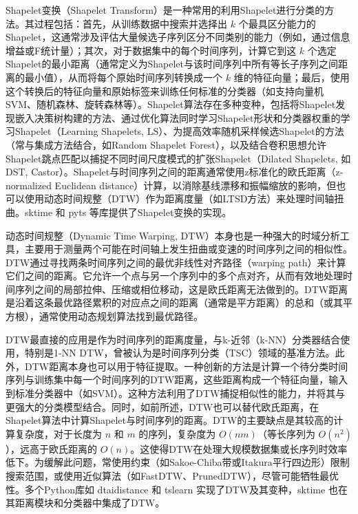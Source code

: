             Shapelet变换（Shapelet Transform）是一种常用的利用Shapelet进行分类的方法。其过程包括：首先，从训练数据中搜索并选择出 $k$ 个最具区分能力的Shapelet，这通常涉及评估大量候选子序列区分不同类别的能力（例如，通过信息增益或F统计量）；其次，对于数据集中的每个时间序列，计算它到这 $k$ 个选定Shapelet的最小距离（通常定义为Shapelet与该时间序列中所有等长子序列之间距离的最小值），从而将每个原始时间序列转换成一个 $k$ 维的特征向量；最后，使用这个转换后的特征向量和原始标签来训练任何标准的分类器（如支持向量机SVM、随机森林、旋转森林等）。Shapelet算法存在多种变种，包括将Shapelet发现嵌入决策树构建的方法、通过优化算法同时学习Shapelet形状和分类器权重的学习Shapelet（Learning Shapelets, LS）、为提高效率随机采样候选Shapelet的方法（常与集成方法结合，如Random Shapelet Forest），以及结合卷积思想允许Shapelet跳点匹配以捕捉不同时间尺度模式的扩张Shapelet（Dilated Shapelets, 如DST, Castor）。Shapelet与时间序列之间的距离通常使用z标准化的欧氏距离（z-normalized Euclidean distance）计算，以消除基线漂移和振幅缩放的影响，但也可以使用动态时间规整（DTW）作为距离度量（如LTSD方法）来处理时间轴扭曲。sktime 和 pyts 等库提供了Shapelet变换的实现。
            
            动态时间规整（Dynamic Time Warping, DTW）本身也是一种强大的时域分析工具，主要用于测量两个可能在时间轴上发生扭曲或变速的时间序列之间的相似性。DTW通过寻找两条时间序列之间的最优非线性对齐路径（warping path）来计算它们之间的距离。它允许一个点与另一个序列中的多个点对齐，从而有效地处理时间序列之间的局部拉伸、压缩或相位移动，这是欧氏距离无法做到的。DTW距离是沿着这条最优路径累积的对应点之间的距离（通常是平方距离）的总和（或其平方根），通常使用动态规划算法找到最优路径。
            
            DTW最直接的应用是作为时间序列的距离度量，与k-近邻（k-NN）分类器结合使用，特别是1-NN DTW，曾被认为是时间序列分类（TSC）领域的基准方法。此外，DTW距离本身也可以用于特征提取。一种创新的方法是计算一个待分类时间序列与训练集中每一个时间序列的DTW距离，这些距离构成一个特征向量，输入到标准分类器中（如SVM）。这种方法利用了DTW捕捉相似性的能力，并将其与更强大的分类模型结合。同时，如前所述，DTW也可以替代欧氏距离，在Shapelet算法中计算Shapelet与时间序列的距离。DTW的主要缺点是其较高的计算复杂度，对于长度为 $n$ 和 $m$ 的序列，复杂度为 $O(nm)$（等长序列为 $O(n^2)$），远高于欧氏距离的 $O(n)$。这使得DTW在处理大规模数据集或长序列时效率低下。为缓解此问题，常使用约束（如Sakoe-Chiba带或Itakura平行四边形）限制搜索范围，或使用近似算法（如FastDTW、PrunedDTW），尽管可能牺牲最优性。多个Python库如 dtaidistance 和 tslearn 实现了DTW及其变种，sktime 也在其距离模块和分类器中集成了DTW。
            

